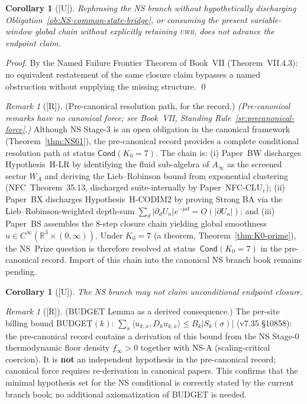 \documentclass[12pt,oneside]{amsbook}
\theoremstyle{plain}
\newtheorem{corollary}[theorem]{Corollary}
\theoremstyle{definition}
\theoremstyle{remark}
\newtheorem{remark}[theorem]{Remark}
\newcommand{\status}[1]{\textup{[#1]}}
\begin{document}
\begin{corollary}[\status{U}]\label{cor:NS-rephrasing-useless}
Rephrasing the NS branch without hypothetically discharging
Obligation~\ref{ob:NS-common-state-bridge}, or consuming the present
variable-window global chain without explicitly retaining
\textsc{uwb}, does not advance the endpoint claim.
\end{corollary}

\begin{proof}
By the Named Failure Frontier Theorem of Book~VII
(Theorem~VII.4.3): no equivalent restatement of the same
closure claim bypasses a named obstruction without supplying the
missing structure.
\qed
\end{proof}

\begin{remark}[\status{R}]\label{rmk:NS-precanonical-path}
\textup{(Pre-canonical resolution path, for the record.)}
\textit{(Pre-canonical remarks have no canonical force;
see Book~VII, Standing Rule~\ref{sr:precanonical-force}.)} 
Although NS Stage-3 is an open obligation in the canonical framework
(Theorem~\ref{thm:NS61}), the pre-canonical record provides a
complete conditional resolution path at status $\mathsf{Cond}(K_0=7)$.
The chain is: \textup{(i)} Paper~BW discharges Hypothesis~H-LR by
identifying the fluid sub-algebra of $A_\infty$ as the screened
sector $W_A$ and deriving the Lieb--Robinson bound from exponential
clustering (NFC~Theorem~35.13, discharged suite-internally by
Paper~NFC-CLU$_r$); \textup{(ii)} Paper~BX discharges
Hypothesis~H-CODIM2 by proving Strong BA via the
Lieb--Robinson-weighted depth-sum
$\sum_d |\partial_d U_n| e^{-\mu d} = O(|\partial U_n|)$; and
\textup{(iii)} Paper~BS assembles the 8-step closure chain yielding
global smoothness $u \in C^\infty(\mathbb{R}^3 \times (0,\infty))$.
Under $K_0 = 7$ (a theorem, Theorem~\ref{thm:K0-prime}), the NS~Prize
question is therefore resolved at status~$\mathsf{Cond}(K_0=7)$ in
the pre-canonical record. Import of this chain into the canonical
NS branch book remains pending.
\end{remark}



\begin{corollary}[\status{U}]\label{cor:NS-no-unconditional}
The NS branch may not claim unconditional endpoint closure.
\end{corollary}


\begin{remark}[\status{R}]
\textup{(BUDGET Lemma as a derived consequence.)}
The per-site billing bound BUDGET$(k)$:
$\sum_x \langle u_{k,x}, D_k u_{k,x}\rangle \leq B_k |S_k(\sigma)|$
(v7.35 \S10858): the pre-canonical record contains a derivation
of this bound from the NS Stage-0 thermodynamic floor density
$f_\infty > 0$ together with NS-A (scaling-critical coercion).
It is \textbf{not} an independent hypothesis in the pre-canonical
record; canonical force requires re-derivation in canonical papers.
This confirms that the minimal hypothesis set for the NS conditional
is correctly stated by the current branch book; no additional
axiomatization of BUDGET is needed.
\end{remark}
\end{document}
